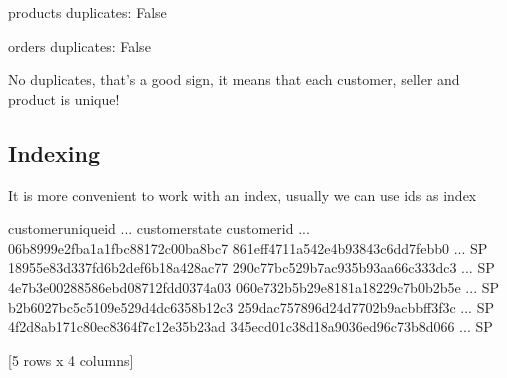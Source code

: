 \documentclass[letterpaper,10pt,english]{jupyterBook}
\begin{document}
\begin{sphinxVerbatim}[commandchars=\\\{\}]
products duplicates: 
False
\end{sphinxVerbatim}

\begin{sphinxVerbatim}[commandchars=\\\{\}]
\end{sphinxVerbatim}

\begin{sphinxVerbatim}[commandchars=\\\{\}]
orders duplicates: 
False
\end{sphinxVerbatim}

\sphinxAtStartPar
No duplicates, that’s a good sign, it means that each customer, seller and product is unique!


\subsection{Indexing}
\label{\detokenize{c7_case_studies/Olist:indexing}}
\sphinxAtStartPar
It is more convenient to work with an index, usually we can use ids as index

\begin{sphinxVerbatim}[commandchars=\\\{\}]
  
\end{sphinxVerbatim}

\begin{sphinxVerbatim}[commandchars=\\\{\}]
                                                customer\PYGZus{}unique\PYGZus{}id  ...  customer\PYGZus{}state
customer\PYGZus{}id                                                         ...                
06b8999e2fba1a1fbc88172c00ba8bc7  861eff4711a542e4b93843c6dd7febb0  ...              SP
18955e83d337fd6b2def6b18a428ac77  290c77bc529b7ac935b93aa66c333dc3  ...              SP
4e7b3e00288586ebd08712fdd0374a03  060e732b5b29e8181a18229c7b0b2b5e  ...              SP
b2b6027bc5c5109e529d4dc6358b12c3  259dac757896d24d7702b9acbbff3f3c  ...              SP
4f2d8ab171c80ec8364f7c12e35b23ad  345ecd01c38d18a9036ed96c73b8d066  ...              SP

[5 rows x 4 columns]
\end{sphinxVerbatim}
\end{document}
